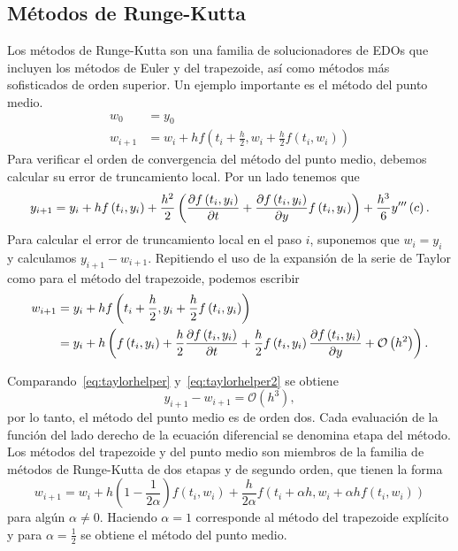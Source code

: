 \subsection{Métodos de Runge-Kutta}

Los métodos de Runge-Kutta son una familia de solucionadores de EDOs
que incluyen los métodos de Euler y del trapezoide, así como métodos
más sofisticados de orden superior.
Un ejemplo importante es el método del punto medio.
\begin{align*}
    w_{0}   & =y_{0}                                                                             \\
    w_{i+1} & =w_{i}+hf\left(t_{i}+\frac{h}{2},w_{i}+\frac{h}{2}f\left(t_{i},w_{i}\right)\right)
\end{align*}
Para verificar el orden de convergencia del método del punto medio,
debemos calcular su error de truncamiento local.
Por un lado tenemos que
\begin{equation}\label{eq:taylorhelper}
    y_{i+1}=y_{i}+hf\left(t_{i},y_{i}\right)+
    \frac{h^{2}}{2}
    \left(
    \diffp{f\left(t_{i},y_{i}\right)}{t}+
    \diffp{f\left(t_{i},y_{i}\right)}{y}
    f\left(t_{i},y_{i}\right)
    \right)+
    \frac{h^{3}}{6}y^{\prime\prime\prime}\left(c\right).
\end{equation}
Para calcular el error de truncamiento local en el paso $i$,
suponemos que $w_{i}=y_{i}$ y calculamos $y_{i+1}-w_{i+1}$.
Repitiendo el uso de la expansión de la serie de Taylor como para
el método del trapezoide, podemos escribir
\begin{align}
    w_{i+1} & =
    y_{i}+hf\left(t_{i}+\frac{h}{2},y_{i}+\frac{h}{2}f\left(t_{i},y_{i}\right)\right) \notag \\
            & =
    y_{i}+
    h
    \left(
    f\left(t_{i},y_{i}\right)+
    \frac{h}{2}\diffp{f\left(t_{i},y_{i}\right)}{t}+
    \frac{h}{2}f\left(t_{i},y_{i}\right)
    \diffp{f\left(t_{i},y_{i}\right)}{y}+
    \mathcal{O}\left(h^{2}\right)
    \right).\label{eq:taylorhelper2}
\end{align}

Comparando~\eqref{eq:taylorhelper} y~\eqref{eq:taylorhelper2} se
obtiene
\begin{equation*}
    y_{i+1}-w_{i+1}=\mathcal{O}\left(h^{3}\right),
\end{equation*}
por lo tanto, el método del punto medio es de orden dos.
Cada evaluación de la función del lado derecho de la ecuación
diferencial se denomina etapa del método.
Los métodos del trapezoide y del punto medio son miembros de la
familia de métodos de Runge-Kutta de dos etapas y de segundo orden,
que tienen la forma
\begin{equation*}
    w_{i+1}=
    w_{i}+
    h\left(1-\frac{1}{2\alpha}\right)
    f\left(t_{i},w_{i}\right)+
    \frac{h}{2\alpha}
    f\left(t_{i}+\alpha h,w_{i}+\alpha hf\left(t_{i},w_{i}\right)\right)
\end{equation*}
para algún $\alpha\neq 0$.
Haciendo $\alpha=1$ corresponde al método del trapezoide explícito y
para $\alpha=\frac{1}{2}$ se obtiene el método del punto medio.

